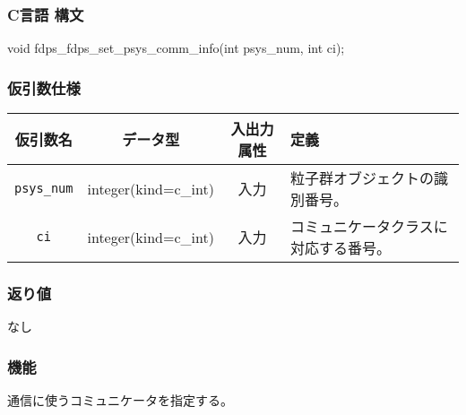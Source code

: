 \subsubsection*{C言語 構文}
\begin{screen}
\begin{spverbatim}
void fdps_fdps_set_psys_comm_info(int psys_num,
                                   int ci);
\end{spverbatim}
\end{screen}



\subsubsection*{仮引数仕様}
\begin{table}[h]
\begin{tabularx}{\linewidth}{cccX}
\toprule
\rowcolor{Snow2}
仮引数名 & データ型 & 入出力属性 & 定義 \\
\midrule
\texttt{psys\_num} & integer(kind=c\_int) & 入力 & 粒子群オブジェクトの識別番号。\\
\texttt{ci} & integer(kind=c\_int) & 入力 & コミュニケータクラスに対応する番号。\\
\bottomrule
\end{tabularx}
\end{table}

\subsubsection*{返り値}
なし

\subsubsection*{機能}

通信に使うコミュニケータを指定する。 


\clearpage
